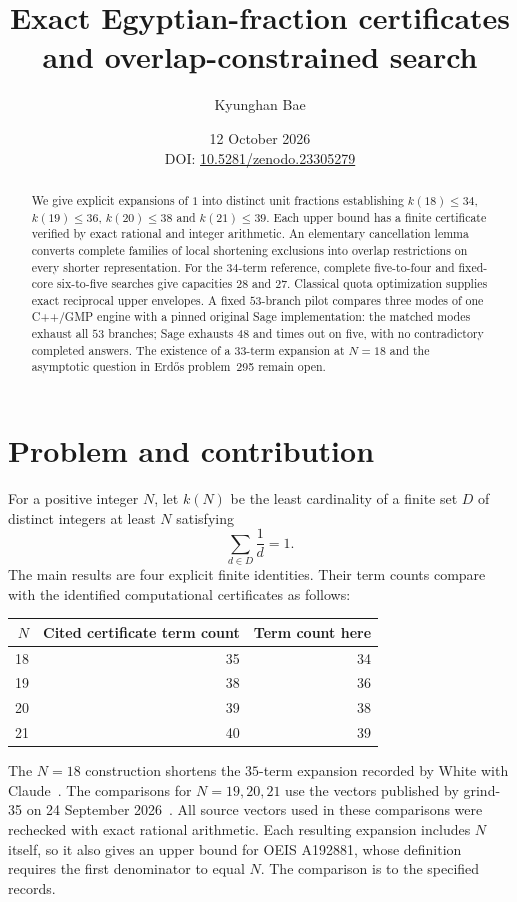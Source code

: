 \documentclass[10pt,a4paper]{article}
\title{Exact Egyptian-fraction certificates\\and overlap-constrained search}
\author{Kyunghan Bae}
\date{12 October 2026\\[3pt]
  \small DOI: \href{https://doi.org/10.5281/zenodo.23305279}{10.5281/zenodo.23305279}}
\begin{document}
\maketitle
\begin{abstract}
We give explicit expansions of $1$ into distinct unit fractions establishing
$k(18)\leq34$, $k(19)\leq36$, $k(20)\leq38$ and $k(21)\leq39$.
Each upper bound has a finite certificate verified by exact rational and integer
arithmetic. An elementary cancellation lemma converts complete families of local
shortening exclusions into overlap restrictions on every shorter representation.
For the $34$-term reference, complete five-to-four and fixed-core six-to-five
searches give capacities $28$ and $27$. Classical quota optimization supplies
exact reciprocal upper envelopes. A fixed $53$-branch pilot compares three modes
of one C++/GMP engine with a pinned original Sage implementation: the matched modes
exhaust all $53$ branches; Sage exhausts $48$ and times out on five, with no
contradictory completed answers. The existence of a $33$-term expansion at $N=18$
and the asymptotic question in Erd\H{o}s problem~295 remain open.
\end{abstract}

\section{Problem and contribution}
For a positive integer $N$, let $k(N)$ be the least cardinality of a finite set
$D$ of distinct integers at least $N$ satisfying
\[
  \sum_{d\in D}\frac1d=1.
\]
The main results are four explicit finite identities. Their term counts compare
with the identified computational certificates as follows:
\begin{center}
\begin{tabular}{rrr}
\toprule
$N$ & Cited certificate term count & Term count here\\
\midrule
18&35&34\\19&38&36\\20&39&38\\21&40&39\\
\bottomrule
\end{tabular}
\end{center}
The $N=18$ construction shortens the $35$-term expansion recorded by White with
Claude~\cite{white}. The comparisons for $N=19,20,21$ use the vectors published by
grind-35 on 24 September 2026~\cite{grind}. All source vectors used in these
comparisons were rechecked with exact rational arithmetic. Each resulting
expansion includes $N$ itself, so it also gives an upper bound for OEIS A192881,
whose definition requires the first denominator to equal $N$. The comparison is
to the specified records.
\end{document}
